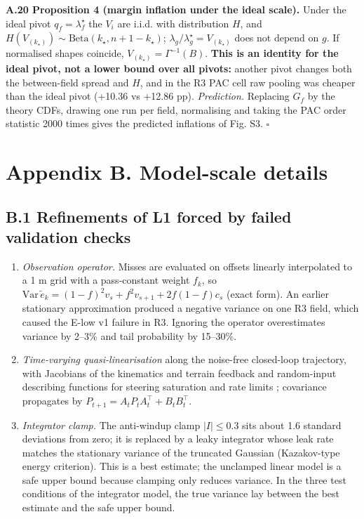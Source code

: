 \documentclass[preprint,12pt,authoryear]{elsarticle}
\begin{document}
\textbf{A.20 Proposition 4 (margin inflation under the ideal scale).} Under the ideal pivot \(q_f=\lambda^\star_f\) the \(V_i\) are i.i.d. with distribution \(H\), and \(H(V_{(k_\star)})\sim\mathrm{Beta}(k_\star,n+1-k_\star)\); \(\lambda_g/\lambda^\star_g=V_{(k_\star)}\) does not depend on \(g\). If normalised shapes coincide, \(V_{(k_\star)}=\Gamma^{-1}(B)\). \textbf{This is an identity for the ideal pivot, not a lower bound over all pivots:} another pivot changes both the between-field spread and \(H\), and in the R3 PAC cell raw pooling was cheaper than the ideal pivot (+10.36 vs +12.86 pp). \emph{Prediction.} Replacing \(G_f\) by the theory CDFs, drawing one run per field, normalising and taking the PAC order statistic 2000 times gives the predicted inflations of Fig. S3. \(\square\)

\section*{Appendix B. Model-scale details}

\subsection*{B.1 Refinements of L1 forced by failed validation checks}

\begin{enumerate}
\def\labelenumi{(\alph{enumi})}
\item
  \emph{Observation operator.} Misses are evaluated on offsets linearly interpolated to a 1 m grid with a pass-constant weight \(f_k\), so \(\mathrm{Var}\,\tilde e_k=(1-f)^2v_s+f^2v_{s+1}+2f(1-f)c_s\) (exact form). An earlier stationary approximation produced a negative variance on one R3 field, which caused the E-low v1 failure in R3. Ignoring the operator overestimates variance by 2--3\% and tail probability by 15--30\%.
\item
  \emph{Time-varying quasi-linearisation} along the noise-free closed-loop trajectory, with Jacobians of the kinematics and terrain feedback and random-input describing functions for steering saturation and rate limits \citep{booton1954,kazakov1956}; covariance propagates by \(P_{t+1}=A_tP_tA_t^\top+B_tB_t^\top\).
\item
  \emph{Integrator clamp.} The anti-windup clamp \(|I|\le0.3\) sits about 1.6 standard deviations from zero; it is replaced by a leaky integrator whose leak rate matches the stationary variance of the truncated Gaussian (Kazakov-type energy criterion). This is a best estimate; the unclamped linear model is a safe upper bound because clamping only reduces variance. In the three test conditions of the integrator model, the true variance lay between the best estimate and the safe upper bound.
\end{enumerate}
\end{document}
